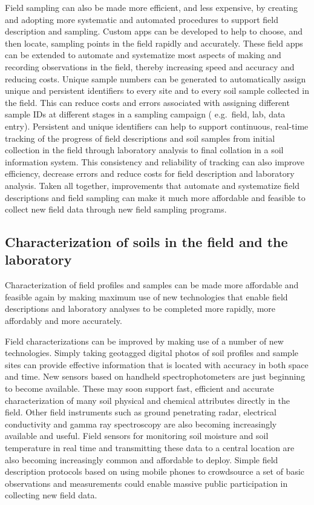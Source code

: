 \documentclass[graybox,natbib,nospthms,UStrade]{svmono}
\begin{document}
Field sampling can also be made more efficient, and less expensive, by
creating and adopting more systematic and automated procedures to
support field description and sampling. Custom apps can be developed to
help to choose, and then locate, sampling points in the field rapidly
and accurately. These field apps can be extended to automate and
systematize most aspects of making and recording observations in the
field, thereby increasing speed and accuracy and reducing costs. Unique
sample numbers can be generated to automatically assign unique and
persistent identifiers to every site and to every soil sample collected
in the field. This can reduce costs and errors associated with assigning
different sample IDs at different stages in a sampling campaign (
e.g.~field, lab, data entry). Persistent and unique identifiers can help to
support continuous, real-time tracking of the progress of field
descriptions and soil samples from initial collection in the field
through laboratory analysis to final collation in a soil information
system. This consistency and reliability of tracking can also improve
efficiency, decrease errors and reduce costs for field description and
laboratory analysis. Taken all together, improvements that automate and
systematize field descriptions and field sampling can make it much more
affordable and feasible to collect new field data through new field
sampling programs.

\hypertarget{characterization-of-soils-in-the-field-and-the-laboratory}{%
\subsection{Characterization of soils in the field and the laboratory}\label{characterization-of-soils-in-the-field-and-the-laboratory}}

Characterization of field profiles and samples can be made more
affordable and feasible again by making maximum use of new technologies
that enable field descriptions and laboratory analyses to be completed
more rapidly, more affordably and more accurately.

Field characterizations can be improved by making use of a number of new
technologies. Simply taking geotagged digital photos of soil profiles
and sample sites can provide effective information that is located with
accuracy in both space and time. New sensors based on handheld
spectrophotometers are just beginning to become available. These may
soon support fast, efficient and accurate characterization of many soil
physical and chemical attributes directly in the field. Other field
instruments such as ground penetrating radar, electrical conductivity
and gamma ray spectroscopy are also becoming increasingly available and
useful. Field sensors for monitoring soil moisture and soil temperature
in real time and transmitting these data to a central location are also
becoming increasingly common and affordable to deploy. Simple field
description protocols based on using mobile phones to crowdsource a set
of basic observations and measurements could enable massive public
participation in collecting new field data.
\end{document}
